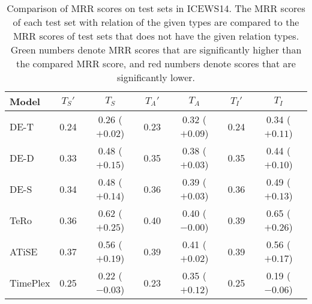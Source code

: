\begin{table*}[htb]
\centering
\begin{minipage}{\fullwidthcaption}
\centering
\caption{Comparison of MRR scores on test sets in ICEWS14. The MRR scores of each test set with relation of the given types are compared to the MRR scores of test sets that does not have the given relation types. Green numbers denote MRR scores that are significantly higher than the compared MRR score, and red numbers denote scores that are significantly lower.}
\vspace{-3mm}

\begin{tabular}{l|cc|cc|cc}\hline
Model & $T_S'$ & $T_S$ & $T_A'$ & $T_A$ & $T_I'$ & $T_I$ \\ \hline
DE-T & 0.24 & 0.26 ($+0.02$) & 0.23 & 0.32 (\textcolor{textgreen}{$+0.09$}) & 0.24 & 0.34 (\textcolor{textgreen}{$+0.11$}) \\ 
DE-D & 0.33 & 0.48 (\textcolor{textgreen}{$+0.15$}) & 0.35 & 0.38 ($+0.03$) & 0.35 & 0.44 (\textcolor{textgreen}{$+0.10$}) \\ 
DE-S & 0.34 & 0.48 (\textcolor{textgreen}{$+0.14$}) & 0.36 & 0.39 ($+0.03$) & 0.36 & 0.49 (\textcolor{textgreen}{$+0.13$}) \\ 
TeRo & 0.36 & 0.62 (\textcolor{textgreen}{$+0.25$}) & 0.40 & 0.40 ($-0.00$) & 0.39 & 0.65 (\textcolor{textgreen}{$+0.26$}) \\ 
ATiSE & 0.37 & 0.56 (\textcolor{textgreen}{$+0.19$}) & 0.39 & 0.41 ($+0.02$) & 0.39 & 0.56 (\textcolor{textgreen}{$+0.17$}) \\ 
TimePlex & 0.25 & 0.22 (\textcolor{textred}{$-0.03$}) & 0.23 & 0.35 (\textcolor{textgreen}{$+0.12$}) & 0.25 & 0.19 (\textcolor{textred}{$-0.06$}) \\ 
 \hline
\end{tabular}

\label{tab:relation_properties_icews14_comparison}
\end{minipage}
\end{table*}

